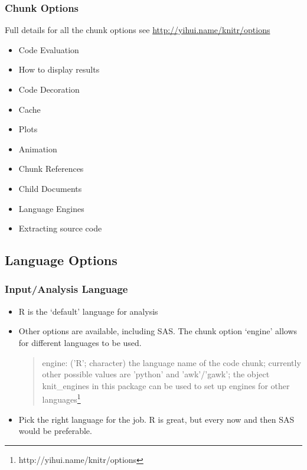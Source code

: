\documentclass[t]{beamer}\usepackage[]{graphicx}\usepackage[]{color}
\begin{document}
\begin{frame}
  \frametitle{Chunk Options}
  Full details for all the chunk options see
  \url{http://yihui.name/knitr/options}
  \begin{itemize}
    \item Code Evaluation
    \item How to display results
    \item Code Decoration
    \item Cache
    \item Plots
    \item Animation
    \item Chunk References
    \item Child Documents
    \item Language Engines
    \item Extracting source code
  \end{itemize}
\end{frame}

\subsection{Language Options}
\begin{frame}
  \frametitle{Input/Analysis Language}
  \begin{itemize}
    \item R is the `default' language for analysis 
    \item Other options are available, including SAS.  The chunk option `engine'
      allows for different languages to be used.

      \begin{quote}
        engine: ('R'; character) the language name of the code chunk; currently
        other possible values are 'python' and 'awk'/'gawk'; the object
        knit\_engines in this package can be used to set up engines for other
        languages\footnote{http://yihui.name/knitr/options}
      \end{quote}

    \item Pick the right language for the job.  R is great, but every now and
      then SAS would be preferable.  
  \end{itemize}
\end{frame}
\end{document}
